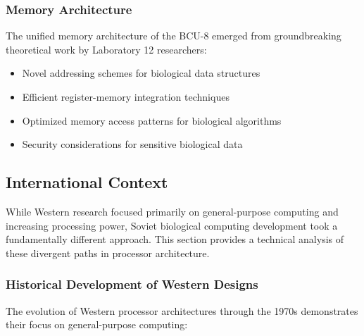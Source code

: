 \documentclass[12pt]{article}
\begin{document}
\subsubsection{Memory Architecture}
The unified memory architecture of the BCU-8 emerged from groundbreaking theoretical work by Laboratory 12 researchers:
\begin{itemize}
    \item Novel addressing schemes for biological data structures
    \item Efficient register-memory integration techniques
    \item Optimized memory access patterns for biological algorithms
    \item Security considerations for sensitive biological data
\end{itemize}

\subsection{International Context}
While Western research focused primarily on general-purpose computing and increasing processing power, Soviet biological computing development took a fundamentally different approach. This section provides a technical analysis of these divergent paths in processor architecture.

\subsubsection{Historical Development of Western Designs}
The evolution of Western processor architectures through the 1970s demonstrates their focus on general-purpose computing:
\end{document}
